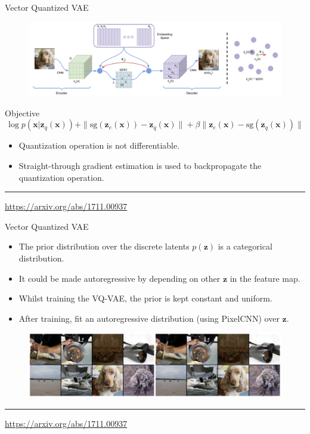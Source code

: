 \documentclass{beamer}
\newcommand{\bx}{\mathbf{x}}
\newcommand{\bz}{\mathbf{z}}
\begin{document}
\begin{frame}{Vector Quantized VAE}
	\begin{figure}
		\centering
		\includegraphics[width=\linewidth]{figs/vqvae}
	\end{figure}
	\begin{block}{Objective}
		\vspace{-0.3cm}
		\[
			\log p(\bx | \bz_q(\bx)) + \| \text{sg} (\bz_e(\bx)) - \bz_q(\bx) \| + \beta \| \bz_e(\bx) - \text{sg}(\bz_q(\bx)) \|
		\]
	\end{block}
	\begin{itemize}
		\item Quantization operation is not differentiable.
		\item Straight-through gradient estimation is used to backpropagate the quantization operation.
	\end{itemize}
	\vfill
	\hrule\medskip
	{\scriptsize \href{https://arxiv.org/abs/1711.00937}{https://arxiv.org/abs/1711.00937}} 
\end{frame}
\begin{frame}{Vector Quantized VAE}
	\begin{itemize}
		\item The prior distribution over the discrete latents $p(\bz)$ is a categorical distribution.
		\item It could be made autoregressive by depending on other $\bz$ in the feature map. 
		\item Whilst training the VQ-VAE, the prior is kept constant and uniform. 
		\item After training, fit an autoregressive distribution (using PixelCNN) over $\bz$.
	\end{itemize}
	\begin{figure}
		\centering
		\includegraphics[width=\linewidth]{figs/vqvae_results}
	\end{figure}
	\vfill
	\hrule\medskip
	{\scriptsize \href{https://arxiv.org/abs/1711.00937}{https://arxiv.org/abs/1711.00937}} 
\end{frame}
\end{document}

